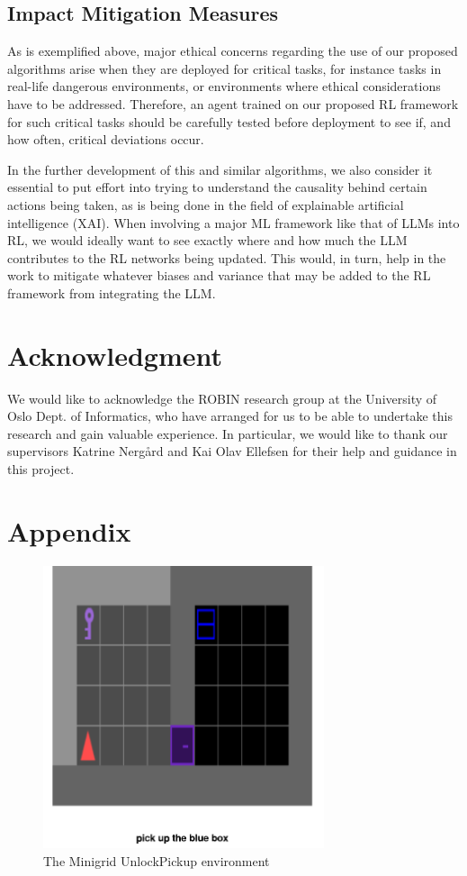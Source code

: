 \documentclass[conference]{IEEEtran}
\begin{document}
\subsection{Impact Mitigation Measures}

As is exemplified above, major ethical concerns regarding the use of our proposed algorithms arise when they are deployed for critical tasks, for instance tasks in real-life dangerous environments, or environments where ethical considerations have to be addressed. Therefore, an agent trained on our proposed RL framework for such critical tasks should be carefully tested before deployment to see if, and how often, critical deviations occur.

In the further development of this and similar algorithms, we also consider it essential to put effort into trying to understand the causality behind certain actions being taken, as is being done in the field of explainable artificial intelligence (XAI). When involving a major ML framework like that of LLMs into RL, we would ideally want to see exactly where and how much the LLM contributes to the RL networks being updated. This would, in turn, help in the work to mitigate whatever biases and variance that may be added to the RL framework from integrating the LLM.

\section*{Acknowledgment}

We would like to acknowledge the ROBIN research group at the University of Oslo Dept. of Informatics, who have arranged for us to be able to undertake this research and gain valuable experience. In particular, we would like to thank our supervisors Katrine Nergård and Kai Olav Ellefsen for their help and guidance in this project.





\section*{Appendix}

\begin{figure}[h]
\centerline{\includegraphics[width=3.25in]{figure/unlockpickupenv.png}}
\caption{The Minigrid UnlockPickup environment}
\label{unlockpickupenv}
\end{figure}
\end{document}
